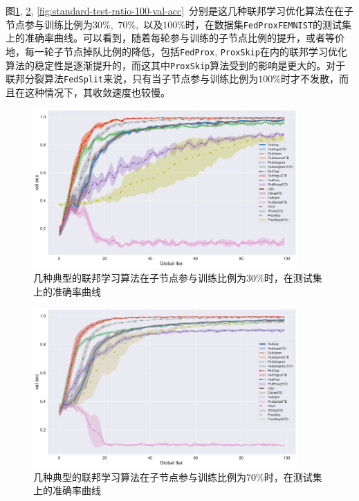 图\ref{fig:standard-test-ratio-30-val-acc}, \ref{fig:standard-test-ratio-70-val-acc}, \ref{fig:standard-test-ratio-100-val-acc}~分别是这几种联邦学习优化算法在在子节点参与训练比例为$30\%,$ $70\%,$ 以及$100\%$时，在数据集\texttt{FedProxFEMNIST}的测试集上的准确率曲线。可以看到，随着每轮参与训练的子节点比例的提升，或者等价地，每一轮子节点掉队比例的降低，包括\texttt{FedProx}, \texttt{ProxSkip}在内的联邦学习优化算法的稳定性是逐渐提升的，而这其中\texttt{ProxSkip}算法受到的影响是更大的。对于联邦分裂算法\texttt{FedSplit}来说，只有当子节点参与训练比例为$100\%$时才不发散，而且在这种情况下，其收敛速度也较慢。

\begin{figure}[H]
    \centering
    \includegraphics[width=0.9\textwidth]{figures/standard-test-ratio-30-val-acc.pdf}
    \caption{几种典型的联邦学习算法在子节点参与训练比例为$30\%$时，在测试集上的准确率曲线}
    \label{fig:standard-test-ratio-30-val-acc}
\end{figure}

\begin{figure}[H]
    \centering
    \includegraphics[width=0.9\textwidth]{figures/standard-test-ratio-70-val-acc.pdf}
    \caption{几种典型的联邦学习算法在子节点参与训练比例为$70\%$时，在测试集上的准确率曲线}
    \label{fig:standard-test-ratio-70-val-acc}
\end{figure}

